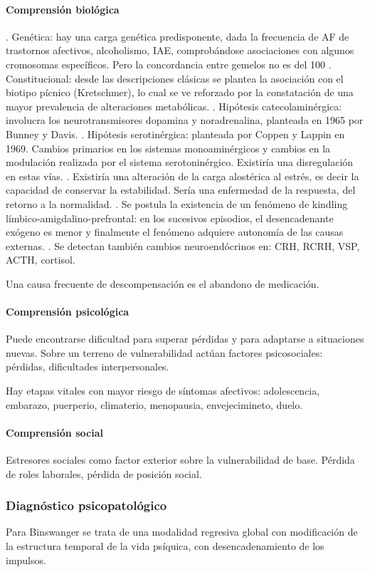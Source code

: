 \paragraph{Comprensión biológica}
. Genética: hay una carga genética predisponente, dada la frecuencia de AF de trastornos afectivos, alcoholismo, IAE, comprobándose asociaciones con algunos cromosomas específicos. Pero la concordancia entre gemelos no es del 100%
. Constitucional: desde las descripciones clásicas se plantea la asociación con el biotipo pícnico (Kretschmer), lo cual se ve reforzado por la constatación de una mayor prevalencia de alteraciones metabólicas.
. Hipótesis catecolaminérgica: involucra los neurotransmisores dopamina y noradrenalina, planteada en 1965 por Bunney y Davis.
. Hipótesis serotinérgica: planteada por Coppen y Lappin en 1969. Cambios primarios en los sistemas monoaminérgicos y cambios en la modulación realizada por el sistema serotoninérgico. Existiría una disregulación en estas vías.
. Existiría una alteración de la carga alostérica al estrés, es decir la capacidad de conservar la estabilidad. Sería una enfermedad de la respuesta, del retorno a la normalidad.
. Se postula la existencia de un fenómeno de kindling límbico-amigdalino-prefrontal: en los sucesivos episodios, el desencadenante exógeno es menor y finalmente el fenómeno adquiere autonomía de las causas externas.
. Se detectan también cambios neuroendócrinos en: CRH, RCRH, VSP, ACTH, cortisol.

Una causa frecuente de descompensación es el abandono de medicación.
\paragraph{Comprensión psicológica}
Puede encontrarse dificultad para superar pérdidas y para adaptarse a situaciones nuevas. Sobre un terreno de vulnerabilidad actúan factores psicosociales: pérdidas, dificultades interpersonales.

Hay etapas vitales con mayor riesgo de síntomas afectivos: adolescencia, embarazo, puerperio, climaterio, menopausia, envejecimineto, duelo.
\paragraph{Comprensión social}
Estresores sociales como factor exterior sobre la vulnerabilidad de base. Pérdida de roles laborales, pérdida de posición social.
\subsubsection*{Diagnóstico psicopatológico}
Para Binswanger se trata de una modalidad regresiva global con modificación de la estructura temporal de la vida psíquica, con desencadenamiento de los impulsos.

